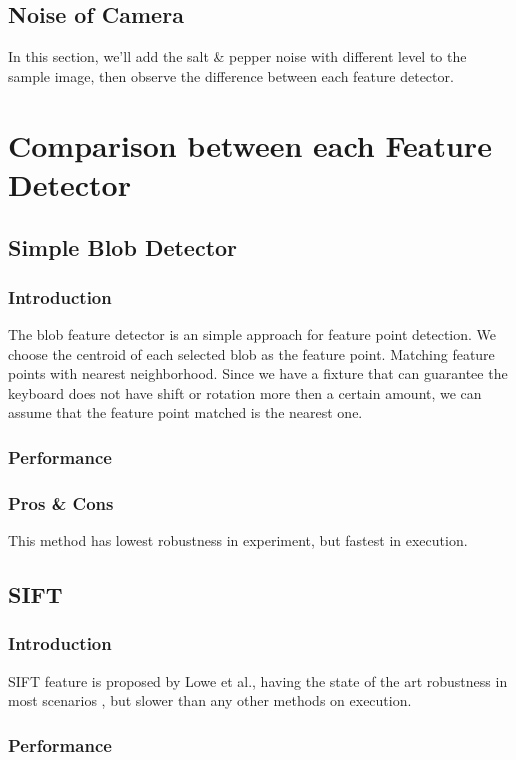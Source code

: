 	\subsection{Noise of Camera}
		In this section, we'll add the salt \& pepper noise with different level to the sample image, then observe the difference between each feature detector.

\section{Comparison between each Feature Detector}
	\subsection{Simple Blob Detector}
		\subsubsection{Introduction}
			The blob feature detector is an simple approach for feature point detection. We choose the centroid of each selected blob as the feature point. Matching feature points with nearest neighborhood. 
			Since we have a fixture that can guarantee the keyboard does not have shift or rotation more then a certain amount, we can assume that the feature point matched is the nearest one.
		\subsubsection{Performance}
		\subsubsection{Pros \& Cons}
			This method has lowest robustness in experiment, but fastest in execution.

	\subsection{SIFT}
		\subsubsection{Introduction}
		SIFT feature is proposed by Lowe \cite{lowe2004distinctive} et al., having the state of the art robustness in most scenarios \cite{karami2017image}, but slower than any other methods on execution.
		\subsubsection{Performance}

